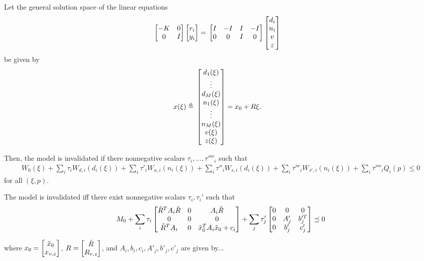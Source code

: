 \documentclass[11pt, onecolumn]{article}
\begin{document}
\begin{theorem}
  Let the general solution space of the linear equations
    \begin{align*}
      \begin{bmatrix}-K & 0\\0&I\end{bmatrix}\begin{bmatrix}r_i\\y_i\end{bmatrix} = &\; \begin{bmatrix}I&-I&I&-I\\0&0&I&0\end{bmatrix}\begin{bmatrix}d_i\\n_i\\v\\z\end{bmatrix}
    \end{align*}
  be given by \\
  \begin{align*}
    x(\xi) \triangleq&\; \begin{bmatrix}d_1(\xi)\\\vdots\\d_M(\xi)\\n_1(\xi)\\\vdots\\n_M(\xi)\\v(\xi)\\z(\xi)\end{bmatrix}= x_0 + R\xi.
  \end{align*}

  Then, the model is invalidated if there nonnegative scalars $\tau_i,\ldots,\tau''''_i$ such that
  \begin{align*}
   W_0(\xi) + \sum_i \tau_i W_{d,i}(d_i(\xi)) + \sum_i \tau'_i W_{n,i}(n_i(\xi)) + \sum_i \tau''_i W_{s,i}(d_i(\xi)) + \sum_i \tau'''_i W_{s^c,i}(n_i(\xi)) + \sum_i \tau''''_i Q_i(p) \leq 0
  \end{align*}
  for all $(\xi,p)$.
\end{theorem}

\begin{corollary}
The model is invalidated iff there exist nonnegative scalars $\tau_i, \tau_i'$ such that
  \begin{align*}
  M_0 + \sum_i \tau_i\begin{bmatrix}\tilde R^T A_i \tilde R &0 & A_i \tilde R\\0 & 0 & 0\\\tilde R^T A_i &0& \tilde x_0^TA_i\tilde x_0 + c_i\end{bmatrix} + \sum_j \tau_j'\begin{bmatrix}0 & 0 & 0 \\ 0 & A_j' & b_j'^T\\0 & b_j' & c_j'\end{bmatrix} \preceq 0
  \end{align*}
\end{corollary}

where $x_0 = \begin{bmatrix}\tilde x_0\\ x_{v,z}\end{bmatrix}$, $R = \begin{bmatrix}\tilde R\\R_{v,z}\end{bmatrix}$, and $A_i,b_i,c_i,A'_j,b'_j,c'_j$ are given by...
\end{document}
